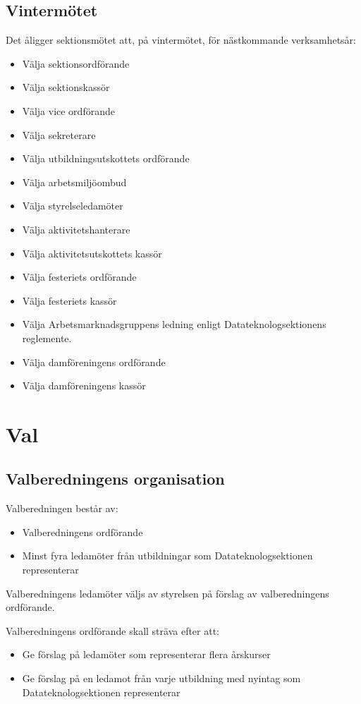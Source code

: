 \documentclass{datateknologsektionen-document}
\begin{document}
    \subsection{Vintermötet}
      Det åligger sektionsmötet att, på vintermötet, för nästkommande verksamhetsår:
      \begin{itemize}
        \item Välja sektionsordförande
        \item Välja sektionskassör
        \item Välja vice ordförande
        \item Välja sekreterare
        \item Välja utbildningsutskottets ordförande
        \item Välja arbetsmiljöombud
        \item Välja styrelseledamöter
	\item Välja aktivitetshanterare
	\item Välja aktivitetsutskottets kassör
        \item Välja festeriets ordförande
        \item Välja festeriets kassör
        \item Välja Arbetsmarknadsgruppens ledning enligt Datateknologsektionens reglemente.
        \item Välja damföreningens ordförande
        \item Välja damföreningens kassör 
      \end{itemize}

  \section{Val}
    \subsection{Valberedningens organisation}
      Valberedningen består av:
      \begin{itemize}
        \item Valberedningens ordförande
        \item Minst fyra ledamöter från utbildningar som Datateknologsektionen representerar
      \end{itemize}

      Valberedningens ledamöter väljs av styrelsen på förslag av valberedningens ordförande.

      Valberedningens ordförande skall sträva efter att:
      \begin{itemize}
        \item Ge förslag på ledamöter som representerar flera årskurser
        \item Ge förslag på en ledamot från varje utbildning med nyintag som Datateknologsektionen representerar
      \end{itemize}
\end{document}
